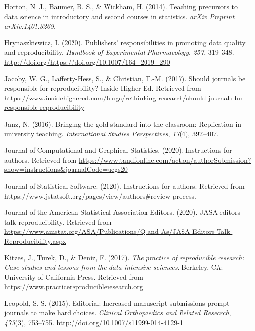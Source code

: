 \documentclass[12pt,twoside]{reedthesis}
\begin{document}
\leavevmode\hypertarget{ref-horton2014teaching}{}%
Horton, N. J., Baumer, B. S., \& Wickham, H. (2014). Teaching precursors to data science in introductory and second courses in statistics. \emph{arXiv Preprint arXiv:1401.3269}.

\leavevmode\hypertarget{ref-hrynaszkiewicz2020publishers}{}%
Hrynaszkiewicz, I. (2020). Publishers' responsibilities in promoting data quality and reproducibility. \emph{Handbook of Experimental Pharmacology}, \emph{257}, 319--348. \url{http://doi.org/https://doi.org/10.1007/164_2019_290}

\leavevmode\hypertarget{ref-higher-ed}{}%
Jacoby, W. G., Lafferty-Hess, S., \& Christian, T.-M. (2017). Should journals be responsible for reproducibility? Inside Higher Ed. Retrieved from \url{https://www.insidehighered.com/blogs/rethinking-research/should-journals-be-responsible-reproducibility}

\leavevmode\hypertarget{ref-janz2016bringing}{}%
Janz, N. (2016). Bringing the gold standard into the classroom: Replication in university teaching. \emph{International Studies Perspectives}, \emph{17}(4), 392--407.

\leavevmode\hypertarget{ref-jcgs-guide}{}%
Journal of Computational and Graphical Statistics. (2020). Instructions for authors. Retrieved from \url{https://www.tandfonline.com/action/authorSubmission?show=instructions\&journalCode=ucgs20}

\leavevmode\hypertarget{ref-jss-guide}{}%
Journal of Statistical Software. (2020). Instructions for authors. Retrieved from \url{https://www.jstatsoft.org/pages/view/authors\#review-process.}

\leavevmode\hypertarget{ref-jasa-rep-editors}{}%
Journal of the American Statistical Association Editors. (2020). JASA editors talk reproducibility. Retrieved from \url{https://www.amstat.org/ASA/Publications/Q-and-As/JASA-Editors-Talk-Reproducibility.aspx}

\leavevmode\hypertarget{ref-kitzes2017practice}{}%
Kitzes, J., Turek, D., \& Deniz, F. (2017). \emph{The practice of reproducible research: Case studies and lessons from the data-intensive sciences}. Berkeley, CA: University of California Press. Retrieved from \url{https://www.practicereproducibleresearch.org}

\leavevmode\hypertarget{ref-leopold2015increased}{}%
Leopold, S. S. (2015). Editorial: Increased manuscript submissions prompt journals to make hard choices. \emph{Clinical Orthopaedics and Related Research}, \emph{473}(3), 753--755. \url{http://doi.org/10.1007/s11999-014-4129-1}
\end{document}
